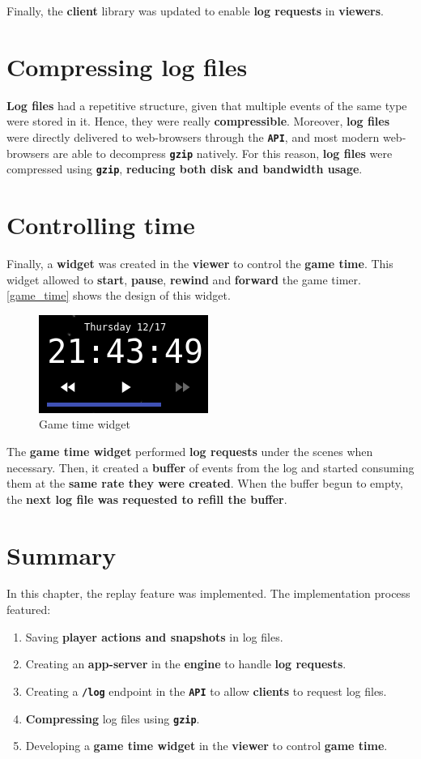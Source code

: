 \documentclass[a4paper,11pt,titlepage,abstract,numbers=noenddot,automark,mnsy,intlimits,rgb,dvipsnames]{report}
\begin{document}
Finally, the \textbf{client} library was updated to enable \textbf{log requests} in \textbf{viewers}.
\section{Compressing log files}
\textbf{Log files} had a repetitive structure, given that multiple events of the same type were stored in it. Hence, they were
really \textbf{compressible}. Moreover, \textbf{log files} were directly delivered to web-browsers through the \textbf{\texttt{API}}, and most modern
web-browsers are able to decompress \textbf{\texttt{gzip}} natively. For this reason, \textbf{log files} were compressed using \textbf{\texttt{gzip}},
\textbf{reducing both disk and bandwidth usage}.
\section{Controlling time}
Finally, a \textbf{widget} was created in the \textbf{viewer} to control the \textbf{game time}. This widget allowed to \textbf{start}, \textbf{pause},
\textbf{rewind} and \textbf{forward} the game timer. \autoref{game_time} shows the design of this widget.
\begin{figure}[H]
\begin{center}
\includegraphics{images/game_time.png}
\end{center}
\caption{Game time widget}
\label{game_time}
\end{figure}
The \textbf{game time widget} performed \textbf{log requests} under the scenes when necessary. Then, it created a \textbf{buffer} of events
from the log and started consuming them at the \textbf{same rate they were created}. When the buffer begun to empty, the \textbf{next log file
was requested to refill the buffer}.
\section{Summary}
In this chapter, the replay feature was implemented. The implementation process featured:
\begin{enumerate}
\item
Saving \textbf{player actions and snapshots} in log files.
\item
Creating an \textbf{app-server} in the \textbf{engine} to handle \textbf{log requests}.
\item
Creating a \textbf{\texttt{/log}} endpoint in the \textbf{\texttt{API}} to allow \textbf{clients} to request log files.
\item
\textbf{Compressing} log files using \textbf{\texttt{gzip}}.
\item
Developing a \textbf{game time widget} in the \textbf{viewer} to control \textbf{game time}.
\end{enumerate}
\end{document}
